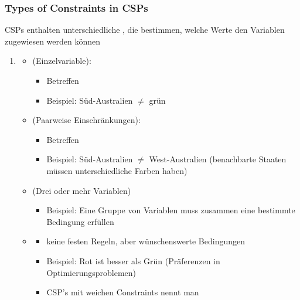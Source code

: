 \subsubsection*{Types of Constraints in CSPs}
CSPs enthalten unterschiedliche , die bestimmen, welche Werte den Variablen zugewiesen werden können
\begin{enumerate}
    \item {}
    \begin{itemize}
        \item {} (Einzelvariable):
        \begin{itemize}
            \item Betreffen 
            \item Beispiel: Süd-Australien $\neq$ grün
        \end{itemize}
        \item {} (Paarweise Einschränkungen):
        \begin{itemize}
            \item Betreffen 
            \item Beispiel: Süd-Australien $\neq$ West-Australien (benachbarte Staaten müssen unterschiedliche Farben haben)
        \end{itemize}
        \item {} (Drei oder mehr Variablen)
        \begin{itemize}
            \item Beispiel: Eine Gruppe von Variablen muss zusammen eine bestimmte Bedingung erfüllen
        \end{itemize}
        \item {}
        \begin{itemize}
            \item keine festen Regeln, aber wünschenswerte Bedingungen
            \item Beispiel: Rot ist besser als Grün (Präferenzen in Optimierungsproblemen)
            \item CSP's mit weichen Constraints nennt man 
        \end{itemize}
    \end{itemize}
\end{enumerate}
